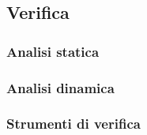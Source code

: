 	\subsection{Verifica}
		\subsubsection{Analisi statica}

		\subsubsection{Analisi dinamica}

		\subsubsection{Strumenti di verifica}